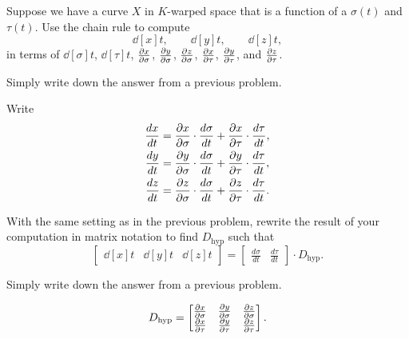 \documentclass{ximera}
\begin{document}
\begin{problem}
Suppose we have a curve $X$ in $K$-warped space that is a function of
a $\sigma(t)$ and $\tau(t)$. Use the chain rule to compute
\[
\dd[x]{t},\qquad \dd[y]{t}, \qquad \dd[z]{t},
\]
in terms of $\dd[\sigma]{t}$, $\dd[\tau]{t}$, $\pp[x]{\sigma}$,
$\pp[y]{\sigma}$, $\pp[z]{\sigma}$, $\pp[x]{\tau}$, $\pp[y]{\tau}$,
and $\pp[z]{\tau}$.
\begin{hint}
  Simply write down the answer from a previous problem.
\end{hint}
\begin{freeResponse}
  Write
  \begin{align*}
    \dd[x]{t} &= \pp[x]{\sigma}\cdot\dd[\sigma]{t}+\pp[x]{\tau}\cdot\dd[\tau]{t}, \\
    \dd[y]{t} &= \pp[y]{\sigma}\cdot\dd[\sigma]{t}+\pp[y]{\tau}\cdot\dd[\tau]{t}, \\
    \dd[z]{t} &= \pp[z]{\sigma}\cdot\dd[\sigma]{t}+\pp[z]{\tau}\cdot\dd[\tau]{t}.  
  \end{align*}
\end{freeResponse}
\end{problem}



\begin{problem}
  With the same setting as in the previous problem, rewrite the result
  of your computation in matrix notation to find $D_{\mathrm{hyp}}$ such
  that
\[
\begin{bmatrix}
\dd[x]{t} & \dd[y]{t} & \dd[z]{t}
\end{bmatrix}
=
\begin{bmatrix}
\frac{d\sigma}{dt} & \frac{d\tau}{dt}
\end{bmatrix}\cdot D_{\mathrm{hyp}}.
\]
\begin{hint}
  Simply write down the answer from a previous problem.
\end{hint}
\begin{freeResponse}
  \[
  D_{\mathrm{hyp}} =
  \begin{bmatrix}
    \pp[x]{\sigma} & \pp[y]{\sigma} & \pp[z]{\sigma} \\
    \pp[x]{\tau}   & \pp[y]{\tau}   & \pp[z]{\tau}
  \end{bmatrix}.
  \]
\end{freeResponse}
\end{problem}
\end{document}
